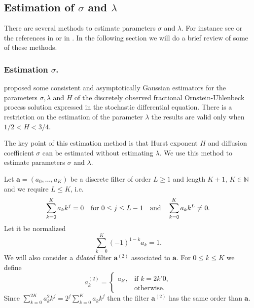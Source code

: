 \documentclass[smallextended]{svjour3}
\newcommand{\IN}{{\mathbb N}}
\begin{document}
\subsection{Estimation of $\sigma$ and  $\lambda$}

        There are several methods to estimate parameters $\sigma$ and  
    $\lambda$. For instance see \cite{ra} or the references in \cite{ne-ti} or 
    in \cite{ku-mi}. In the following section we will do a brief review of
    some of these methods.

    \subsubsection{Estimation $\sigma$.}
    \label{sect-est}
        \citet{br-ia} proposed some consistent and asymptotically
    Gaussian estimators for the parameters $\sigma,\lambda$ and $H$ of
    the discretely observed fractional Ornstein-Uhlenbeck process solution
    expressed in the stochastic differential equation.
    There is a restriction on  the estimation of the parameter $\lambda$
    \textemdash the results are valid only when $ 1 / 2 < H < 3 / 4$. 

        The key point of this estimation method is that Hurst exponent $H$ 
    and diffusion coefficient $\sigma $ can be estimated without
    estimating $\lambda$.  We use this method to estimate parameters
    $\sigma$ and $\lambda$.

        Let $\bm{a} = (a_0,\ldots, a_K )$ be a discrete filter of 
    order $L\ge 1$ and
    length $K+1$, $K \in\IN$ and we require  $L\le K$, i.e.
    \[
        \sum_{k=0}^K a_k k^j =0 
        \quad 
        \hbox{\rm  for } 
        0 \le j \le  L-1 
        \quad 
        \hbox{\rm and} 
        \quad  
        \sum_{k=0}^K a_k k^L \ne 0.
    \]
    Let it be normalized
    \[
        \sum_{k=0}^K (-1)^{1-k} a_k =1.
    \]
    We will also consider a {\it dilated} 
    filter $\bm{a}^{(2)}$ associated to $\bm{a}$. 
    For $0\le k\le K$ we define
    \[
        a_k^{(2)} = 
        \begin{cases} 
            a_{k'}, 
            & \mbox{if } k=2k' 0,
            \\
            & \mbox{otherwise.}
        \end{cases}
    \]
    Since $\sum_{k=0}^{2K} a_k^2 k^j=2^j \sum_{k=0}^K a_k k^j $ 
    then the filter $\bm{a}^{(2)}$ has the same order than  $\bm{a}$.
\end{document}
